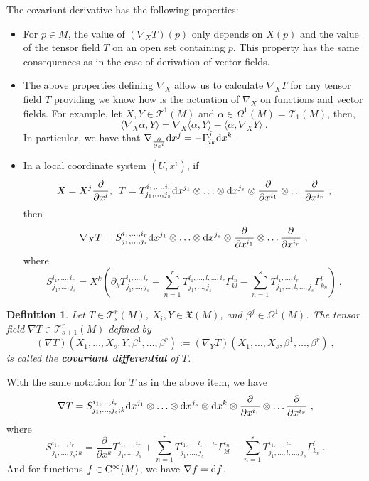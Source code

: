 \documentclass[12pt]{report}
\newtheorem{definition}[teor]{Definition}
\def\derpar#1#2{\frac{\partial{#1}}{\partial{#2}}}
\def\vf{\mathfrak X}
\def\d{{\rm d}}
\def\Cinfty{{\rm C}^\infty}
\begin{document}
The covariant derivative has the following properties:
\begin{itemize}
\item 
For $p\in M$, the value of $(\nabla_{X} T)(p)$ only depends on $X(p)$ and the value of the tensor field $T$ on an open set containing $p$. This property has the same consequences as in the case of derivation of vector fields.
\item
The above properties defining $\nabla_{X}$ allow us to calculate $\nabla_{X}T$ for any tensor field $T$ providing we know how is the actuation of $\nabla_{X}$ on functions and vector fields. 
For example, let $X,Y\in\mathcal{T}^{1}(M)$ and $\alpha\in\Omega^{1} (M)=\mathcal{T}_{1}(M)$, then,
$$
\langle \nabla_{X}\alpha,Y\rangle= \nabla_{X}\langle\alpha,Y\rangle-\langle\alpha, \nabla_{X}Y\rangle \ .
$$     
In particular, we have that
$\nabla_{\frac{\partial}{\partial x^{i}}}\d x^{j}=-\Gamma_{ik}^{j}\d x^{k}$.
\item
In a local coordinate system $(U,x^i)$, if
$$
X=X^{j}{\frac{\partial}{\partial x^{i}}}, \,\,\, T=T_{j_{1},
\ldots,j_{s}}^{{i_{1},\ldots,i_{r}}}
\d x^{j_{1}}\otimes\ldots\otimes\d x^{j_{s}}\otimes{\frac{\partial}{\partial x^{i_{1}}}}\otimes\ldots{\frac{\partial}{\partial x^{i_{r}}}} \ ,
$$
then
$$
 \nabla_{X}T=S_{j_{1},
\ldots,j_{s}}^{{i_{1},\ldots,i_{r}}}
\d x^{j_{1}}\otimes\ldots\otimes\d x^{j_{s}}\otimes{\frac{\partial}{\partial x^{i_{1}}}}\otimes\ldots{\frac{\partial}{\partial x^{i_{r}}}}\ ;
$$
where
$$
S_{j_{1},
\ldots,j_{s}}^{{i_{1},\ldots,i_{r}}}=
X^{k}(\partial_{k}T_{j_{1},
\ldots,j_{s}}^{{i_{1},\ldots,i_{r}}}+
\sum_{n=1}^{r} T_{j_{1},
\ldots,j_{s}}^{{i_{1},\ldots,l,\dots,i_{r}}}\Gamma_{kl}^{i_{n}}-
\sum_{n=1}^{s} T_{j_{1},
\ldots,l,\dots,j_{s}}^{{i_{1},\ldots,i_{r}}}\Gamma_{k_{n}}^{l})\ .
$$
\end{itemize}

\begin{definition}
Let $T\in\mathcal{T}_{s}^{r}(M)$, $X_{i},Y\in\vf(M)$, and $\beta^{j}\in\Omega^{1}(M)$.
The tensor field $\nabla T\in\mathcal{T}_{s+1}^{r}(M)$ defined by
$$
(\nabla T)(X_{1},\ldots,X_{s},Y,\beta^{1},\ldots,\beta^{r}):=(\nabla_{Y} T)(X_{1},\ldots,X_{s},\beta^{1},\ldots,\beta^{r}) \ ,
$$
is called the {\sl \textbf{covariant differential}} of $T$.
\end{definition}

With the same notation for $T$ as in the above item, we have 
$$
 \nabla T=S_{j_{1},
\ldots,j_{s};k}^{{i_{1},\ldots,i_{r}}}
\d x^{j_{1}}\otimes\ldots\otimes\d x^{j_{s}}\otimes\d x^{k}\otimes{\frac{\partial}{\partial x^{i_{1}}}}\otimes\ldots{\frac{\partial}{\partial x^{i_{r}}}} \ ,
$$
where
$$
S_{j_{1},
\ldots,j_{s};k}^{{i_{1},\ldots,i_{r}}}=
\derpar{}{x^k}T_{j_{1},
\ldots,j_{s}}^{{i_{1},\ldots,i_{r}}}+
\sum_{n=1}^{r} T_{j_{1},
\ldots,j_{s}}^{{i_{1},\ldots,l,\dots,i_{r}}}\Gamma_{kl}^{i_{n}}-
\sum_{n=1}^{s} T_{j_{1},
\ldots,l,\dots,j_{s}}^{{i_{1},\ldots,i_{r}}}\Gamma_{k_{n}}^{l}\ .
$$
And for functions $f\in\Cinfty(M)$, we have $\nabla f=\d f$.
\end{document}
